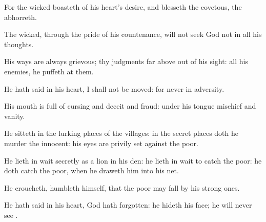 {\par }{\Q {}For the
wicked
boasteth of his
heart’s
desire, and
blesseth the
covetous,
{} the
{}
abhorreth.


\par }{\Q {}The
wicked, through the
pride of his
countenance, will not
seek
{}
God
{} not in all his
thoughts.


\par }{\Q {}His
ways are
always
grievous; thy
judgments
{} far
above out of his sight:
{} all his
enemies, he
puffeth at them.


\par }{\Q {}He hath
said in his
heart, I shall not be
moved: for
{}
never
{} in
adversity.


\par }{\Q {}His
mouth is
full of
cursing and
deceit and
fraud: under his
tongue
{}
mischief and
vanity.


\par }{\Q {}He
sitteth in the lurking
places of the
villages: in the secret
places doth he
murder the
innocent: his
eyes are privily
set against the
poor.


\par }{\Q {}He lieth in
wait
secretly as a
lion in his
den: he lieth in
wait to
catch the
poor: he doth
catch the
poor, when he
draweth him into his
net.


\par }{\Q {}He
croucheth,
{}
humbleth himself, that the
poor may
fall by his strong
ones.


\par }{\Q {}He hath
said in his
heart,
God hath
forgotten: he
hideth his
face; he will
never
see
{}.


\par }{\BB \par }
